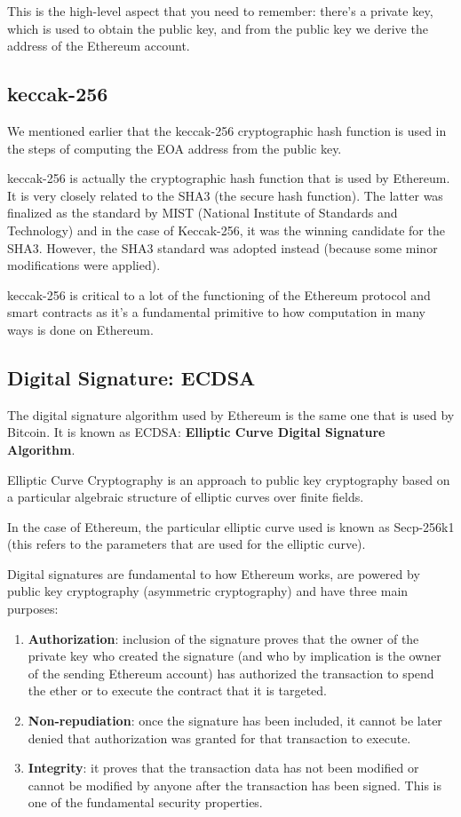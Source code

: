 This is the high-level aspect that you need to remember: there's a
private key, which is used to obtain the public key, and from the public
key we derive the address of the Ethereum account.

\subsection{keccak-256}\label{keccak-256}

We mentioned earlier that the keccak-256 cryptographic hash function is
used in the steps of computing the EOA address from the public key.

keccak-256 is actually the cryptographic hash function that is used by
Ethereum. It is very closely related to the SHA3 (the secure hash
function). The latter was finalized as the standard by MIST (National
Institute of Standards and Technology) and in the case of Keccak-256, it
was the winning candidate for the SHA3. However, the SHA3 standard was
adopted instead (because some minor modifications were applied).

keccak-256 is critical to a lot of the functioning of the Ethereum
protocol and smart contracts as it's a fundamental primitive to how
computation in many ways is done on Ethereum.

\subsection{Digital Signature: ECDSA}\label{digital-signature-ecdsa}

The digital signature algorithm used by Ethereum is the same one that is
used by Bitcoin. It is known as ECDSA: \textbf{Elliptic Curve Digital
Signature Algorithm}.

Elliptic Curve Cryptography is an approach to public key cryptography
based on a particular algebraic structure of elliptic curves over finite
fields.

In the case of Ethereum, the particular elliptic curve used is known as
Secp-256k1 (this refers to the parameters that are used for the elliptic
curve).

Digital signatures are fundamental to how Ethereum works, are powered by
public key cryptography (asymmetric cryptography) and have three main
purposes:

\begin{enumerate}
\def\labelenumi{\arabic{enumi}.}
\tightlist
\item
  \textbf{Authorization}: inclusion of the signature proves that the
  owner of the private key who created the signature (and who by
  implication is the owner of the sending Ethereum account) has
  authorized the transaction to spend the ether or to execute the
  contract that it is targeted.
\item
  \textbf{Non-repudiation}: once the signature has been included, it
  cannot be later denied that authorization was granted for that
  transaction to execute.
\item
  \textbf{Integrity}: it proves that the transaction data has not been
  modified or cannot be modified by anyone after the transaction has
  been signed. This is one of the fundamental security properties.
\end{enumerate}
